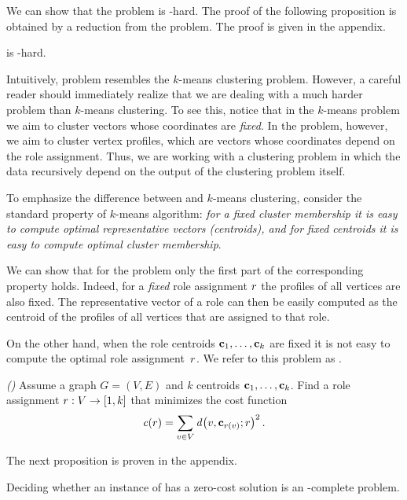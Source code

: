 We can show that the \prbrm problem is  \np-hard.
The proof of the following proposition is obtained 
by a reduction from the \tmatch problem.
The proof is given in the appendix.

\begin{proposition}
\label{proposition:np}
\prbrm is \np-hard.
\end{proposition}

Intuitively, problem \prbrm resembles the $k$-means clustering problem.
However, a careful reader should immediately realize
that we are dealing with a much harder problem than $k$-means clustering.
To see this, notice that in the $k$-means problem 
we aim to cluster vectors whose coordinates are \emph{fixed}. 
In the \prbrm problem, however, we aim to cluster vertex profiles,
which are vectors whose coordinates depend on the role assignment.
Thus, we are working with a clustering problem
in which the data recursively depend on the output of the clustering problem itself.

To emphasize the difference between \prbrm and $k$-means clustering, 
consider the standard property of $k$-means algorithm:
\emph{for a fixed cluster membership it is easy to compute optimal representative vectors (centroids), 
and for fixed centroids it is easy to compute optimal cluster membership}. 

We can show that for the \prbrm problem
only the first part of the corresponding property holds.
Indeed, for a \emph{fixed} role assignment $r$
the profiles of all vertices are also fixed.
The representative vector of a role
can then be easily computed as the centroid
of the profiles of all vertices that are assigned to that role. 

On the other hand, 
when the role centroids $\mathbf{c}_1, \ldots, \mathbf{c}_k$ are fixed
it is not easy to compute the optimal role assignment~$r$.
We refer to this problem as \prbrmfixed.

\begin{problem} 
\label{problem:role-mining-fixed}
\emph{(\prbrmfixed)}
Assume a graph $G = (V, E)$ %
and $k$ centroids $\mathbf{c}_1, \ldots, \mathbf{c}_k$.
Find a role assignment ${r}:{V} \to {[1, k]}$ 
that minimizes the cost function
\[
\cost{\role} = 
\sum_{v \in V} \dist{v, \centroid_{\role(v)}; \role}^2.
\]
\end{problem}

The next proposition is proven in the appendix.

\begin{proposition}
\label{proposition:np-fixed}
Deciding whether an instance of \prbrmfixed has a zero-cost solution 
is an \np-complete problem. 
\end{proposition}

